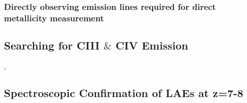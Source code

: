 \documentclass{literature}
\begin{document}
\subsubsection{Directly observing emission lines required for direct metallicity measurement}




\subsection{Searching for CIII $\&$ CIV Emission}
\citep{Zitrin2015}, \citep{Stark2015}



\subsection{Spectroscopic Confirmation of LAEs at z=7-8}


\clearpage 

%

\end{document}
